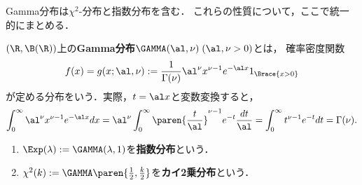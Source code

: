 \documentclass[uplatex,dvipdfmx]{jsarticle}
\begin{document}
\begin{tcolorbox}[colframe=ForestGreen, colback=ForestGreen!10!white,breakable,colbacktitle=ForestGreen!40!white,coltitle=black,fonttitle=\bfseries\sffamily,
title=]
    Gamma分布は$\chi^2$-分布と指数分布を含む．
    これらの性質について，ここで統一的にまとめる．
\end{tcolorbox}

\begin{definition}\label{def-Gamma-distribution}
    $(\R,\B(\R))$上の\textbf{Gamma分布}$\GAMMA(\al,\nu)\;(\al,\nu>0)$とは，
    確率密度関数
    \[f(x)=g(x;\al,\nu):=\frac{1}{\Gamma(\nu)}\al^\nu x^{\nu-1}e^{-\al x}1_{\Brace{x>0}}\]
    が定める分布をいう．実際，$t=\al x$と変数変換すると，
    \[\int_0^\infty \al^\nu x^{\nu-1}e^{-\al x}dx=\al^\nu\int^\infty_0\paren{\frac{t}{\al}}^{\nu-1}e^{-t}\frac{dt}{\al}=\int^\infty_0t^{\nu-1}e^{-t}dt=\Gamma(\nu).\]
\end{definition}
\begin{example}\mbox{}\label{exp-Gamma-distribution}
    \begin{enumerate}
        \item $\Exp(\lambda):=\GAMMA(\lambda,1)$を\textbf{指数分布}という．
        \item $\chi^2(k):=\GAMMA\paren{\frac{1}{2},\frac{k}{2}}$を\textbf{カイ2乗分布}という．
    \end{enumerate}
\end{example}
\end{document}
